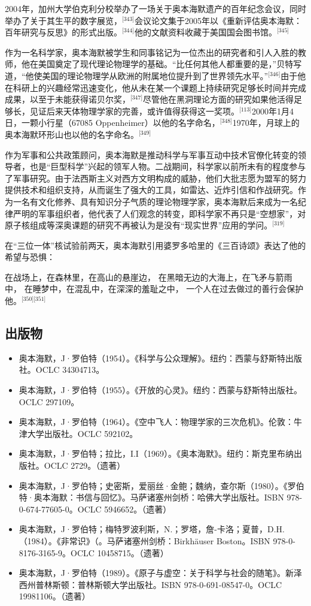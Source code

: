 2004年，加州大学伯克利分校举办了一场关于奥本海默遗产的百年纪念会议，同时举办了关于其生平的数字展览，\(^\text{[343]}\)会议论文集于2005年以《重新评估奥本海默：百年研究与反思》的形式出版。\(^\text{[344]}\)他的文献资料收藏于美国国会图书馆。\(^\text{[345]}\)

作为一名科学家，奥本海默被学生和同事铭记为一位杰出的研究者和引人入胜的教师，他在美国奠定了现代理论物理学的基础。“比任何其他人都重要的是，”贝特写道，“他使美国的理论物理学从欧洲的附属地位提升到了世界领先水平。”\(^\text{[346]}\)由于他在科研上的兴趣经常迅速变化，他从未在某一个课题上持续研究足够长时间并完成成果，以至于未能获得诺贝尔奖，\(^\text{[347]}\)尽管他在黑洞理论方面的研究如果他活得足够长，见证后来天体物理学家的完善，或许值得获得这一奖项。\(^\text{[113]}\)2000年1月4日，一颗小行星（67085 Oppenheimer）以他的名字命名，\(^\text{[348]}\)1970年，月球上的奥本海默环形山也以他的名字命名。\(^\text{[349]}\)

作为军事和公共政策顾问，奥本海默是推动科学与军事互动中技术官僚化转变的领导者，也是“巨型科学”兴起的领军人物。二战期间，科学家以前所未有的程度参与了军事研究。由于法西斯主义对西方文明构成的威胁，他们大批志愿为盟军的努力提供技术和组织支持，从而诞生了强大的工具，如雷达、近炸引信和作战研究。作为一名有文化修养、具有知识分子气质的理论物理学家，奥本海默后来成为一名纪律严明的军事组织者，他代表了人们观念的转变，即科学家不再只是“空想家”，对原子核组成等深奥课题的研究不再被认为是没有“现实世界”应用的学问。\(^\text{[319]}\)

在“三位一体”核试验前两天，奥本海默引用婆罗多哈里的《三百诗颂》表达了他的希望与恐惧：

在战场上，在森林里，在高山的悬崖边，
在黑暗无边的大海上，在飞矛与箭雨中，
在睡梦中，在混乱中，在深深的羞耻之中，
一个人在过去做过的善行会保护他。\(^\text{[350][351]}\)
\subsection{出版物}
\begin{itemize}
\item 奥本海默，J·罗伯特（1954）。《科学与公众理解》。纽约：西蒙与舒斯特出版社。OCLC 34304713。
\item 奥本海默，J·罗伯特（1955）。《开放的心灵》。纽约：西蒙与舒斯特出版社。OCLC 297109。
\item 奥本海默，J·罗伯特（1964）。《空中飞人：物理学家的三次危机》。伦敦：牛津大学出版社。OCLC 592102。
\item 奥本海默，J·罗伯特；拉比，I.I（1969）。《奥本海默》。纽约：斯克里布纳出版社。OCLC 2729。（遗著）
\item 奥本海默，J·罗伯特；史密斯，爱丽丝·金鲍；魏纳，查尔斯（1980）。《罗伯特·奥本海默：书信与回忆》。马萨诸塞州剑桥：哈佛大学出版社。ISBN 978-0-674-77605-0。OCLC 5946652。（遗著）
\item 奥本海默，J·罗伯特；梅特罗波利斯，N.；罗塔，詹-卡洛；夏普，D.H.（1984）。《非常识》（。马萨诸塞州剑桥：Birkhäuser Boston。ISBN 978-0-8176-3165-9。OCLC 10458715。（遗著）
\item 奥本海默，J·罗伯特（1989）。《原子与虚空：关于科学与社会的随笔》。新泽西州普林斯顿：普林斯顿大学出版社。ISBN 978-0-691-08547-0。OCLC 19981106。（遗著）
\end{itemize}
